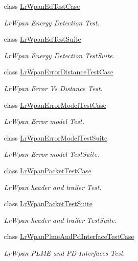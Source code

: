 \begin{DoxyCompactItemize}
class \hyperlink{classLrWpanEdTestCase}{Lr\+Wpan\+Ed\+Test\+Case}
\begin{DoxyCompactList}\small\item\em Lr\+Wpan Energy Detection Test. \end{DoxyCompactList}\item 
class \hyperlink{classLrWpanEdTestSuite}{Lr\+Wpan\+Ed\+Test\+Suite}
\begin{DoxyCompactList}\small\item\em Lr\+Wpan Energy Detection Test\+Suite. \end{DoxyCompactList}\item 
class \hyperlink{classLrWpanErrorDistanceTestCase}{Lr\+Wpan\+Error\+Distance\+Test\+Case}
\begin{DoxyCompactList}\small\item\em Lr\+Wpan Error Vs Distance Test. \end{DoxyCompactList}\item 
class \hyperlink{classLrWpanErrorModelTestCase}{Lr\+Wpan\+Error\+Model\+Test\+Case}
\begin{DoxyCompactList}\small\item\em Lr\+Wpan Error model Test. \end{DoxyCompactList}\item 
class \hyperlink{classLrWpanErrorModelTestSuite}{Lr\+Wpan\+Error\+Model\+Test\+Suite}
\begin{DoxyCompactList}\small\item\em Lr\+Wpan Error model Test\+Suite. \end{DoxyCompactList}\item 
class \hyperlink{classLrWpanPacketTestCase}{Lr\+Wpan\+Packet\+Test\+Case}
\begin{DoxyCompactList}\small\item\em Lr\+Wpan header and trailer Test. \end{DoxyCompactList}\item 
class \hyperlink{classLrWpanPacketTestSuite}{Lr\+Wpan\+Packet\+Test\+Suite}
\begin{DoxyCompactList}\small\item\em Lr\+Wpan header and trailer Test\+Suite. \end{DoxyCompactList}\item 
class \hyperlink{classLrWpanPlmeAndPdInterfaceTestCase}{Lr\+Wpan\+Plme\+And\+Pd\+Interface\+Test\+Case}
\begin{DoxyCompactList}\small\item\em Lr\+Wpan P\+L\+ME and PD Interfaces Test. \end{DoxyCompactList}\item 

\end{DoxyCompactItemize}
